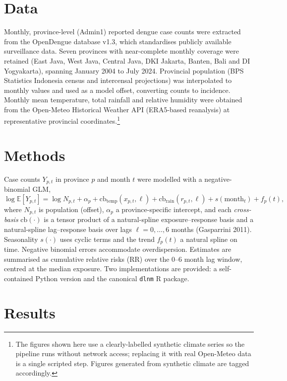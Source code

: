 \documentclass[11pt]{article}
\begin{document}
\section{Data}
Monthly, province-level (Admin1) reported dengue case counts were extracted from
the OpenDengue database v1.3, which standardises publicly available surveillance
data. Seven provinces with near-complete monthly coverage were retained (East
Java, West Java, Central Java, DKI Jakarta, Banten, Bali and DI Yogyakarta),
spanning January 2004 to July 2024. Provincial population (BPS Statistics
Indonesia census and intercensal projections) was interpolated to monthly values
and used as a model offset, converting counts to incidence. Monthly mean
temperature, total rainfall and relative humidity were obtained from the
Open-Meteo Historical Weather API (ERA5-based reanalysis) at representative
provincial coordinates.\footnote{The figures shown here use a clearly-labelled
synthetic climate series so the pipeline runs without network access; replacing
it with real Open-Meteo data is a single scripted step. Figures generated from
synthetic climate are tagged accordingly.}

\section{Methods}
Case counts $Y_{p,t}$ in province $p$ and month $t$ were modelled with a
negative-binomial GLM,
\begin{equation*}
\log \mathbb{E}[Y_{p,t}] = \log N_{p,t} + \alpha_p
+ \mathrm{cb}_{\text{temp}}(x_{p,t},\ell)
+ \mathrm{cb}_{\text{rain}}(r_{p,t},\ell)
+ s(\text{month}_t) + f_p(t),
\end{equation*}
where $N_{p,t}$ is population (offset), $\alpha_p$ a province-specific intercept,
and each \emph{cross-basis} $\mathrm{cb}(\cdot)$ is a tensor product of a
natural-spline exposure--response basis and a natural-spline lag--response basis
over lags $\ell = 0,\dots,6$ months (Gasparrini 2011). Seasonality $s(\cdot)$
uses cyclic terms and the trend $f_p(t)$ a natural spline on time. Negative
binomial errors accommodate overdispersion. Estimates are summarised as
cumulative relative risks (RR) over the 0--6 month lag window, centred at the
median exposure. Two implementations are provided: a self-contained Python
version and the canonical \texttt{dlnm} R package.

\section{Results}
\end{document}
